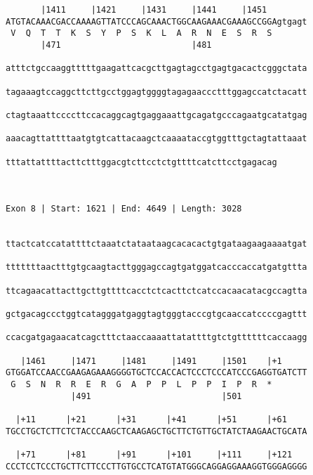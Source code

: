 \documentclass{article}
\begin{document}
\begin{Verbatim}
       |1411     |1421     |1431     |1441     |1451        
ATGTACAAACGACCAAAAGTTATCCCAGCAAACTGGCAAGAAACGAAAGCCGGAgtgagt
 V  Q  T  T  K  S  Y  P  S  K  L  A  R  N  E  S  R  S       
       |471                          |481                   
  
atttctgccaaggtttttgaagattcacgcttgagtagcctgagtgacactcgggctata
                                                            
tagaaagtccaggcttcttgcctggagtggggtagagaaccctttggagccatctacatt
                                                            
ctagtaaattccccttccacaggcagtgaggaaattgcagatgcccagaatgcatatgag
                                                            
aaacagttattttaatgtgtcattacaagctcaaaataccgtggtttgctagtattaaat
                                                            
tttattattttacttctttggacgtcttcctctgttttcatcttcctgagacag
                                                      
                                                      
 
Exon 8 | Start: 1621 | End: 4649 | Length: 3028


ttactcatccatattttctaaatctataataagcacacactgtgataagaagaaaatgat
                                                            
tttttttaactttgtgcaagtacttgggagccagtgatggatcacccaccatgatgttta
                                                            
ttcagaacattacttgcttgttttcacctctcacttctcatccacaacatacgccagtta
                                                            
gctgacagccctggtcatagggatgaggtagtgggtacccgtgcaaccatccccgagttt
                                                            
ccacgatgagaacatcagctttctaaccaaaattatattttgtctgttttttcaccaagg
                                                            
   |1461     |1471     |1481     |1491     |1501    |+1     
GTGGATCCAACCGAAGAGAAAGGGGTGCTCCACCACTCCCTCCCATCCCGAGGTGATCTT
 G  S  N  R  R  E  R  G  A  P  P  L  P  P  I  P  R  *       
             |491                          |501             
  
  |+11      |+21      |+31      |+41      |+51      |+61    
TGCCTGCTCTTCTCTACCCAAGCTCAAGAGCTGCTTCTGTTGCTATCTAAGAACTGCATA
                                                            
  |+71      |+81      |+91      |+101     |+111     |+121   
CCCTCCTCCCTGCTTCTTCCCTTGTGCCTCATGTATGGGCAGGAGGAAAGGTGGGAGGGG
                                                            

\end{Verbatim}
\end{document}

